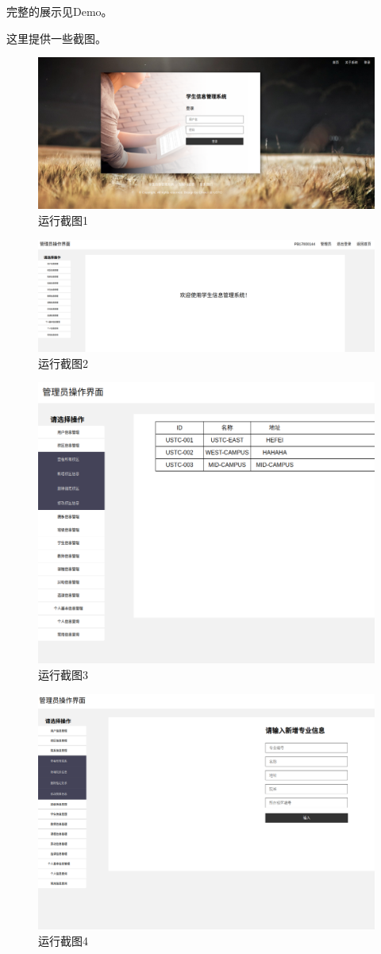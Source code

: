 \documentclass[../report.tex]{subfiles}
\begin{document}
完整的展示见Demo。

这里提供一些截图。
\begin{figure}[H]
\centering
\includegraphics[width=0.7\linewidth]{figure/show1}
\caption{运行截图1}
\label{fig:show1}
\end{figure}
\begin{figure}[H]
\centering
\includegraphics[width=0.7\linewidth]{figure/show2}
\caption{运行截图2}
\label{fig:show2}
\end{figure}
\begin{figure}[H]
\centering
\includegraphics[width=0.7\linewidth]{figure/show3}
\caption{运行截图3}
\label{fig:show3}
\end{figure}
\begin{figure}[H]
\centering
\includegraphics[width=0.7\linewidth]{figure/show4}
\caption{运行截图4}
\label{fig:show4}
\end{figure}
\end{document}
